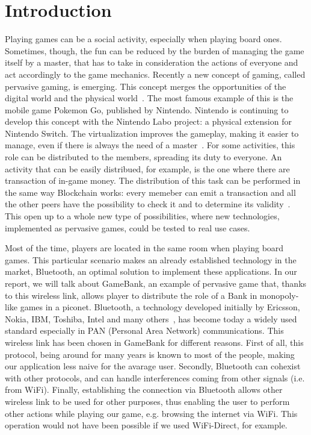 \section{Introduction}

Playing games can be a social activity, especially when playing board ones. 
Sometimes, though, the fun can be reduced by the burden of managing the 
game itself by a master, that has to take in consideration the actions of 
everyone and act accordingly to the game mechanics. Recently a new concept of 
gaming, called pervasive gaming, is emerging. This concept merges the 
opportunities of the digital world and the physical world~\cite{arango17}. The 
most famous example of this is the mobile game Pokemon Go, published by 
Nintendo. Nintendo is continuing to develop this concept with the Nintendo Labo 
project: a physical extension for Nintendo Switch.
The virtualization improves the gameplay, making it easier to manage, even if 
there is always the need of a master~\cite{bjork01}.
For some activities, this role can be distributed to the members, spreading its 
duty to everyone. An activity that can be easily distribued, for example, is the 
one where there are transaction of in-game money. The distribution of this task 
can be performed in the same way Blockchain works: every memeber can emit a 
transaction and all the other peers have the possibility to check it and to 
determine its validity~\cite{nakamoto08}. This open up to a whole new type of 
possibilities, where new technologies, implemented as pervasive games, could be 
tested to real use cases.

Most of the time, players are located in the same room when playing board 
games. This particular scenario makes an already established technology in 
the market, Bluetooth, an optimal solution to implement these applications. In 
our report, we will talk about GameBank, an example of pervasive game that, 
thanks to this wireless link, allows player to distribute the role of a Bank in 
monopoly-like games in a piconet.
Bluetooth, a technology developed initially by Ericsson, Nokia, IBM, Toshiba, 
Intel and many others~\cite{haartsen00}, has become today a widely used
standard especially in PAN (Personal Area Network) communications. This
wireless link has been chosen in GameBank for different reasons. First of all,
this protocol, being around for many years is known to most of the people,
making our application less naive for the avarage user. Secondly, Bluetooth can
cohexist with other protocols, and can handle interferences coming from other
signals (i.e. from WiFi). Finally, establishing the connection via Bluetooth
allows other wireless link to be used for other purposes, thus enabling the
user to perform other actions while playing our game, e.g. browsing the
internet via WiFi. This operation would not have been possible if we used 
WiFi-Direct, for example.\\

